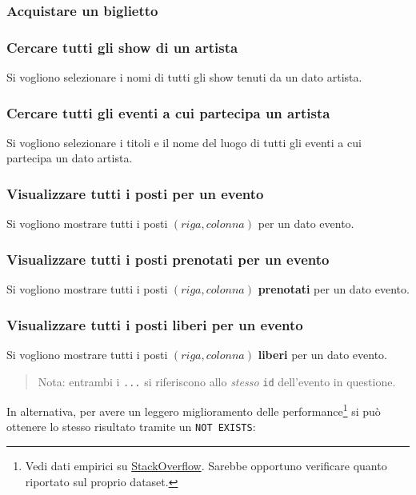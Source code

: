\documentclass[a4paper,11pt]{article}
\begin{document}
\subsubsection{Acquistare un biglietto}


\subsubsection{Cercare tutti gli show di un artista}
Si vogliono selezionare i nomi di tutti gli show tenuti da un dato artista.


\subsubsection{Cercare tutti gli eventi a cui partecipa un artista}
Si vogliono selezionare i titoli e il nome del luogo di tutti gli eventi a cui
partecipa un dato artista.


\subsubsection{Visualizzare tutti i posti per un evento}
Si vogliono mostrare tutti i posti $(riga, colonna)$ per un dato evento.


\subsubsection{Visualizzare tutti i posti prenotati per un evento}
Si vogliono mostrare tutti i posti $(riga, colonna)$ \textbf{prenotati} per un dato evento.


\subsubsection{Visualizzare tutti i posti liberi per un evento}
Si vogliono mostrare tutti i posti $(riga, colonna)$ \textbf{liberi} per un dato evento.


\begin{quote}
  Nota: entrambi i \texttt{...} si riferiscono allo \emph{stesso} \texttt{id}
  dell'evento in questione.
\end{quote}

In alternativa, per avere un leggero miglioramento delle performance\footnote{
Vedi dati empirici su \href{https://stackoverflow.com/a/66785790}{StackOverflow}.
Sarebbe opportuno verificare quanto riportato sul proprio dataset.} si pu\`o
ottenere lo stesso risultato tramite un \texttt{NOT EXISTS}:

\end{document}

